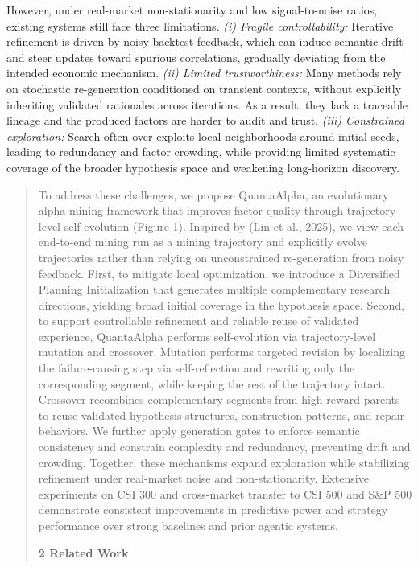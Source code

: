 \documentclass[
]{article}
\begin{document}
However, under real-market non-stationarity and low signal-to-noise
ratios, existing systems still face three limitations. \emph{(i) Fragile
controllability:} Iterative refinement is driven by noisy backtest
feedback, which can induce semantic drift and steer updates toward
spurious correlations, gradually deviating from the intended economic
mechanism. \emph{(ii) Limited trustworthiness:} Many methods rely on
stochastic re-generation conditioned on transient contexts, without
explicitly inheriting validated rationales across iterations. As a
result, they lack a traceable lineage and the produced factors are
harder to audit and trust. \emph{(iii) Constrained exploration:} Search
often over-exploits local neighborhoods around initial seeds, leading to
redundancy and factor crowding, while providing limited systematic
coverage of the broader hypothesis space and weakening long-horizon
discovery.

\begin{quote}
To address these challenges, we propose QuantaAlpha, an evolutionary
alpha mining framework that improves factor quality through
trajectory-level self-evolution (Figure 1). Inspired by (Lin et al.,
2025), we view each end-to-end mining run as a mining trajectory and
explicitly evolve trajectories rather than relying on unconstrained
re-generation from noisy feedback. First, to mitigate local
optimization, we introduce a Diversified Planning Initialization that
generates multiple complementary research directions, yielding broad
initial coverage in the hypothesis space. Second, to support
controllable refinement and reliable reuse of validated experience,
QuantaAlpha performs self-evolution via trajectory-level mutation and
crossover. Mutation performs targeted revision by localizing the
failure-causing step via self-reflection and rewriting only the
corresponding segment, while keeping the rest of the trajectory intact.
Crossover recombines complementary segments from high-reward parents to
reuse validated hypothesis structures, construction patterns, and repair
behaviors. We further apply generation gates to enforce semantic
consistency and constrain complexity and redundancy, preventing drift
and crowding. Together, these mechanisms expand exploration while
stabilizing refinement under real-market noise and non-stationarity.
Extensive experiments on CSI 300 and cross-market transfer to CSI 500
and S\&P 500 demonstrate consistent improvements in predictive power and
strategy performance over strong baselines and prior agentic systems.

\textbf{2 Related Work}
\end{quote}
\end{document}
